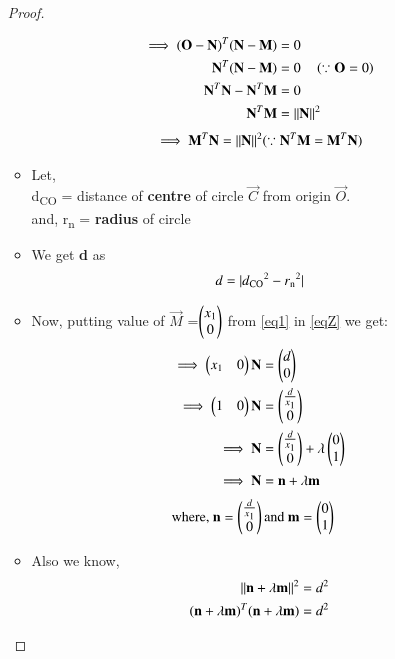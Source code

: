 \documentclass[journal,12pt,twocolumn]{IEEEtran}
\begin{document}
\begin{enumerate}
\begin{proof}
\begin{itemize}
\begin{align}
 \implies (\mathbf{O}-\mathbf{N})^T (\mathbf{N}-\mathbf{M}) &= 0
 \\
 \mathbf{N}^T(\mathbf{N}-\mathbf{M})&= 0 \quad \left(\because \mathbf{O}=0\right)
 \\
  \mathbf{N}^T \mathbf{N} - \mathbf{N}^T \mathbf{M} &= 0  
  \\
   \mathbf{N}^T \mathbf{M} &=\lVert\mathbf{N}\rVert^2
  \end{align}
 \begin{align}
  \implies\mathbf{M}^T \mathbf{N} =\lVert\mathbf{N}\rVert^2 (\because \mathbf{N}^T \mathbf{M}=\mathbf{M}^T \mathbf{N}) \label{eqZ}
 \end{align}
\item Let,
  \\
  d\textsubscript{CO} = distance of \textbf{centre} of circle $\vec{C}$ from origin $\vec{O}$.
  \\
  and,  r\textsubscript{n} = \textbf{radius} of circle
  \\
\item We get \textbf{d} as 
\begin{align}
    d = \lvert d\textsubscript{CO}^2-r\textsubscript{n}^2\vert
    \end{align}
\item Now, putting value of $\vec{M}$ =$\begin{pmatrix}x\textsubscript{1} \\0\end{pmatrix}$ from \eqref{eq1} in \eqref{eqZ} we get:
\begin{align}
    \implies   \begin{pmatrix}x\textsubscript{1}&0\end{pmatrix}\mathbf{N} &=\begin{pmatrix}d\\0\end{pmatrix} 
    \\
    \implies   \begin{pmatrix}1&0\end{pmatrix}\mathbf{N} &=\begin{pmatrix}\frac{d}{x\textsubscript{1}}\\0\end{pmatrix} 
    \\
    \implies \mathbf{N}&=\begin{pmatrix}\frac{d}{x\textsubscript{1}}\\0\end{pmatrix} +\lambda\begin{pmatrix}0\\1\end{pmatrix}
  \\
    \implies \mathbf{N}&=\mathbf{n}+\lambda\mathbf{m} 
   \end{align}
    \begin{align}
   \text{where, }\mathbf{n}&=\begin{pmatrix}\frac{d}{x\textsubscript{1}}\\0\end{pmatrix} \text{and }\mathbf{m}=\begin{pmatrix}0\\1\end{pmatrix}
   \end{align}
\item Also we know,
\begin{align}
\lVert\mathbf{n}+\lambda\mathbf{m}\rVert^2&=d^2
\\
(\mathbf{n}+\lambda \mathbf{m})^T(\mathbf{n}+\lambda \mathbf{m})&=d^2
\end{align}

\end{itemize}
\end{proof}
\end{enumerate}
\end{document}
